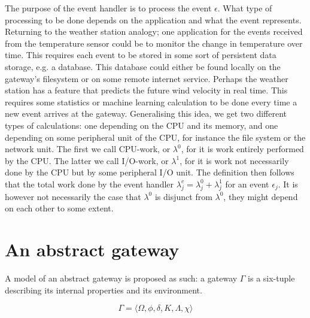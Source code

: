 The purpose of the event handler is to process the event $\epsilon$. What type
of processing to be done depends on the application and what the event
represents. Returning to the weather station analogy; one application for the
events received from the temperature sensor could be to monitor the change in
temperature over time. This requires each event to be stored in some sort of
persistent data storage, e.g. a database. This database could either be found
locally on the gateway's filesystem or on some remote internet service. Perhaps
the weather station has a feature that predicts the future wind velocity in
real time. This requires some statistics or machine learning calculation to be
done every time a new event arrives at the gateway. Generalising this idea, we
get two different types of calculations: one depending on the CPU and its
memory, and one depending on some peripheral unit of the CPU, for instance the
file system or the network unit. The first we call CPU-work, or $\lambda^0$,
for it is work entirely performed by the CPU. The latter we call I/O-work, or
$\lambda^1$, for it is work not necessarily done by the CPU but by some
peripheral I/O unit. The definition then follows that the total work done by
the event handler $\lambda^e_j = \lambda^0_j + \lambda^1_j$ for an event
$\epsilon_j$. It is however not necessarily the case that $\lambda^0$ is
disjunct from $\lambda^0$, they might depend on each other to some extent.

\section{An abstract gateway}

A model of an abstract gateway is proposed as such: a gateway $\Gamma$ is a
six-tuple describing its internal properties and its environment.

\begin{equation}
\Gamma = \big \langle \Omega, \phi, \delta, K, \Lambda, \chi \big \rangle
\end{equation}


